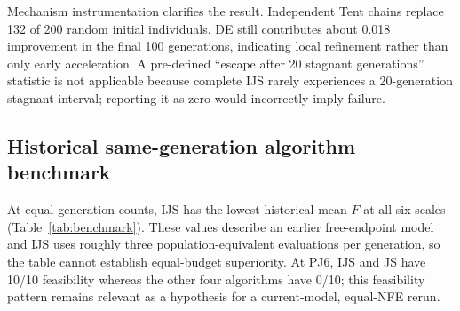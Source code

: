 \documentclass[preprint,12pt]{elsarticle}
\begin{document}
Mechanism instrumentation clarifies the result. Independent Tent chains replace 132 of 200 random initial individuals. DE still contributes about 0.018 improvement in the final 100 generations, indicating local refinement rather than only early acceleration. A pre-defined ``escape after 20 stagnant generations'' statistic is not applicable because complete IJS rarely experiences a 20-generation stagnant interval; reporting it as zero would incorrectly imply failure.

\subsection{Historical same-generation algorithm benchmark}

At equal generation counts, IJS has the lowest historical mean $F$ at all six scales (Table~\ref{tab:benchmark}). These values describe an earlier free-endpoint model and IJS uses roughly three population-equivalent evaluations per generation, so the table cannot establish equal-budget superiority. At PJ6, IJS and JS have 10/10 feasibility whereas the other four algorithms have 0/10; this feasibility pattern remains relevant as a hypothesis for a current-model, equal-NFE rerun.

\begin{table}[t]
\centering
\caption{Historical objective mean (SD) over ten runs. Equal generations do not mean equal NFE.}
\label{tab:benchmark}
\scriptsize
{}
\end{table}
\end{document}
